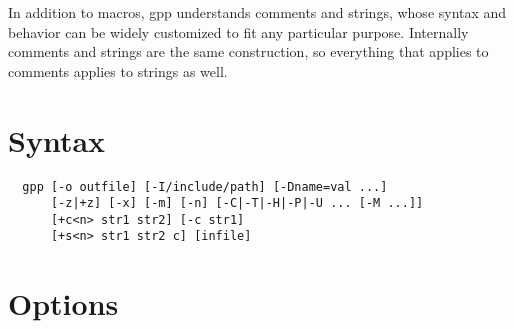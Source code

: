 In addition to macros, gpp understands comments and strings, whose syntax
and behavior can be widely customized to fit any particular purpose.
Internally comments and strings are the same construction, so everything
that applies to comments applies to strings as well.
\section{Syntax}

\begin{verbatim}
  gpp [-o outfile] [-I/include/path] [-Dname=val ...]
      [-z|+z] [-x] [-m] [-n] [-C|-T|-H|-P|-U ... [-M ...]] 
      [+c<n> str1 str2] [-c str1]
      [+s<n> str1 str2 c] [infile]\end{verbatim}

\section{Options}


